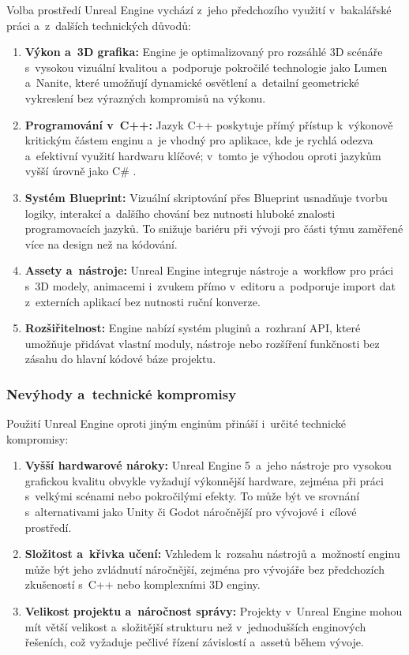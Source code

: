 Volba prostředí Unreal Engine vychází z~jeho předchozího využití v~bakalářské práci \cite{Jochec2023} a~z~dalších technických důvodů:

\begin{enumerate}
    \item \textbf{Výkon a~3D grafika:} Engine je optimalizovaný pro rozsáhlé 3D scénáře s~vysokou vizuální kvalitou a~podporuje pokročilé technologie jako Lumen a~Nanite, které umožňují dynamické osvětlení a~detailní geometrické vykreslení bez výrazných kompromisů na výkonu.
    \item \textbf{Programování v~C++:} Jazyk C++ poskytuje přímý přístup k~výkonově kritickým částem enginu a~je vhodný pro aplikace, kde je rychlá odezva a~efektivní využití hardwaru klíčové; v~tomto je výhodou oproti jazykům vyšší úrovně jako C\# .
    \item \textbf{Systém Blueprint:} Vizuální skriptování přes Blueprint usnadňuje tvorbu logiky, interakcí a~dalšího chování bez nutnosti hluboké znalosti programovacích jazyků. To snižuje bariéru při vývoji pro části týmu zaměřené více na design než na kódování.
    \item \textbf{Assety a~nástroje:} Unreal Engine integruje nástroje a~workflow pro práci s~3D modely, animacemi i~zvukem přímo v~editoru a~podporuje import dat z~externích aplikací bez nutnosti ruční konverze.
    \item \textbf{Rozšiřitelnost:} Engine nabízí systém pluginů a~rozhraní API, které umožňuje přidávat vlastní moduly, nástroje nebo rozšíření funkčnosti bez zásahu do hlavní kódové báze projektu.
\end{enumerate}

\subsubsection{Nevýhody a~technické kompromisy}

Použití Unreal Engine oproti jiným enginům přináší i~určité technické kompromisy:

\begin{enumerate}
    \item \textbf{Vyšší hardwarové nároky:} Unreal Engine 5~a~jeho nástroje pro vysokou grafickou kvalitu obvykle vyžadují výkonnější hardware, zejména při práci s~velkými scénami nebo pokročilými efekty. To může být ve srovnání s~alternativami jako Unity či Godot náročnější pro vývojové i~cílové prostředí.
    \item \textbf{Složitost a~křivka učení:} Vzhledem k~rozsahu nástrojů a~možností enginu může být jeho zvládnutí náročnější, zejména pro vývojáře bez předchozích zkušeností s~C++ nebo komplexními 3D enginy.
    \item \textbf{Velikost projektu a~náročnost správy:} Projekty v~Unreal Engine mohou mít větší velikost a~složitější strukturu než v~jednodušších enginových řešeních, což vyžaduje pečlivé řízení závislostí a~assetů během vývoje.
\end{enumerate}

